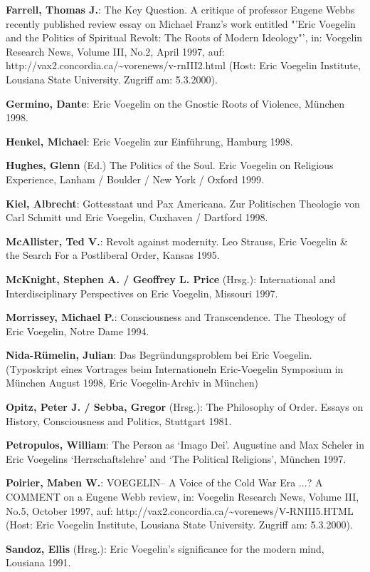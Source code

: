{\bf Farrell, Thomas J.}: The Key Question. A critique of professor Eugene
Webbs recently published review essay on Michael Franz's work entitled "'Eric
Voegelin and the Politics of Spiritual Revolt: The Roots of Modern Ideology"',
in: Voegelin Research News, Volume III, No.2, April 1997, auf:
http://vax2.concordia.ca/\~{ }vorenews/v-rnIII2.html (Host: Eric Voegelin
Institute, Lousiana State University. Zugriff am: 5.3.2000).

{\bf Germino, Dante}: Eric Voegelin on the Gnostic Roots of Violence, München
1998.

{\bf Henkel, Michael}: Eric Voegelin zur Einführung, Hamburg 1998.

{\bf Hughes, Glenn} (Ed.) The Politics of the Soul. Eric Voegelin on Religious
Experience, Lanham / Boulder / New York / Oxford 1999.

{\bf Kiel, Albrecht}: Gottesstaat und Pax Americana. Zur Politischen Theologie
von Carl Schmitt und Eric Voegelin, Cuxhaven / Dartford 1998.

{\bf McAllister, Ted V.}: Revolt against modernity. Leo Strauss, Eric Voegelin
\& the Search For a Postliberal Order, Kansas 1995.

{\bf McKnight, Stephen A. / Geoffrey L. Price} (Hrsg.): International and
Interdisciplinary Perspectives on Eric Voegelin, Missouri 1997.

{\bf Morrissey, Michael P.}: Consciousness and Transcendence. The Theology of
Eric Voegelin, Notre Dame 1994.

{\bf Nida-Rümelin, Julian}: Das Begründungsproblem bei Eric
Voegelin. (Typoskript eines Vortrages beim Internationeln Eric-Voegelin
Symposium in München August 1998, Eric Voegelin-Archiv in München)

{\bf Opitz, Peter J. / Sebba, Gregor} (Hrsg.): The Philosophy of Order. Essays
on History, Consciousness and Politics, Stuttgart 1981.

{\bf Petropulos, William}: The Person as `Imago Dei'. Augustine and Max
Scheler in Eric Voegelins `Herrschaftslehre' and `The Political Religions',
München 1997.

{\bf Poirier, Maben W.}: VOEGELIN-- A Voice of the Cold War Era ...? A COMMENT
on a Eugene Webb review, in: Voegelin Research News, Volume III, No.5, October
1997, auf: http://vax2.concordia.ca/\~{ }vorenews/V-RNIII5.HTML (Host:
Eric Voegelin Institute, Lousiana State University. Zugriff am: 5.3.2000).

{\bf Sandoz, Ellis} (Hrsg.): Eric Voegelin's significance for the modern
mind, Lousiana 1991.

